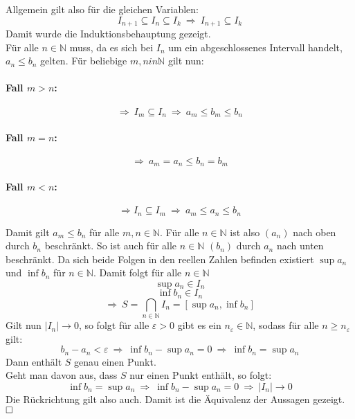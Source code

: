 \documentclass[10pt, a4paper]{article}
\begin{document}
			Allgemein gilt also für die gleichen Variablen:
			\[
				I_{n+1} \subseteq I_{n} \subseteq I_{k} \ \Rightarrow \ I_{n+1} \subseteq I_{k}
			\]
			Damit wurde die Induktionsbehauptung gezeigt.\\


		Für alle $n \in \mathbb{N}$ muss, da es sich bei $I_n$ um ein abgeschlossenes Intervall handelt, $a_n \leq b_n$ gelten. Für beliebige $m,n in \mathbb{N}$ gilt nun:

		\paragraph{Fall $m>n$:} %
		\label{par:fall_}
		
			\[
				\Rightarrow \ I_m\subseteq I_n \ \Rightarrow \ a_m \leq b_m \leq b_n
			\]


		\paragraph{Fall $m = n$:} %
		\label{par:fall_}
		
			\[
				\Rightarrow \ a_m = a_n \leq b_n = b_m
			\]


		\paragraph{Fall $m < n$:} %
		\label{par:fall_}
		
			\[
				\Rightarrow I_n \subseteq I_m \ \Rightarrow \ a_m \leq a_n \leq b_n
			\]


		Damit gilt $a_m \leq b_n$ für alle $m,n \in \mathbb{N}$. Für alle $n \in \mathbb{N}$ ist also $(a_n)$ nach oben durch $b_n$ beschränkt. So ist auch für alle $n \in \mathbb{N}$ $(b_n)$ durch $a_n$ nach unten beschränkt. Da sich beide Folgen in den reellen Zahlen befinden existiert $\sup a_n$ und $\inf b_n$ für $n \in \mathbb{N}$. Damit folgt für alle $n \in \mathbb{N}$
		\[
			\sup a_n \in I_n
		\]
		\[
			\inf b_n \in I_n
		\]
		\[
			\Rightarrow \ S= \bigcap_{n\in \mathbb{N}} I_n = [\sup a_n, \inf b_n]
		\]
		Gilt nun $|I_n| \longrightarrow 0$, so folgt für alle $\varepsilon > 0$ gibt es ein $n_{\varepsilon} \in \mathbb{N}$, sodass für alle $n \geq n_{\varepsilon}$ gilt:
		\[
			b_n - a_n < \varepsilon \ \Rightarrow \ \inf b_n - \sup a_n = 0 \ \Rightarrow \ \inf b_n = \sup a_n
		\]
		Dann enthält $S$ genau einen Punkt.\\
		Geht man davon aus, dass $S$ nur einen Punkt enthält, so folgt:
		\[
			\inf b_n = \sup a_n \ \Rightarrow \ \inf b_n - \sup a_n = 0 \ \Rightarrow \ |I_n| \longrightarrow 0
		\]
		Die Rückrichtung gilt also auch. Damit ist die Äquivalenz der Aussagen gezeigt. $\hfill\Box$\\
\end{document}
